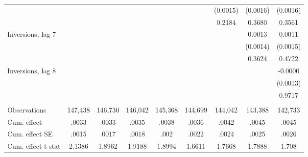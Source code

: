 \begin{tabular}{lcccccccc}
 &  &  &  &  &  & (0.0015) & (0.0016) & (0.0016) \\
 &  &  &  &  &  & 0.2184 & 0.3680 & 0.3561 \\
Inversions, lag 7 &  &  &  &  &  &  & 0.0013 & 0.0011 \\
 &  &  &  &  &  &  & (0.0014) & (0.0015) \\
 &  &  &  &  &  &  & 0.3624 & 0.4722 \\
Inversions, lag 8 &  &  &  &  &  &  &  & -0.0000 \\
 &  &  &  &  &  &  &  & (0.0013) \\
 &  &  &  &  &  &  &  & 0.9717 \\
 &  &  &  &  &  &  &  &  \\
Observations & 147,438 & 146,730 & 146,042 & 145,368 & 144,699 & 144,042 & 143,388 & 142,733 \\
Cum. effect & .0033 & .0033 & .0035 & .0038 & .0036 & .0042 & .0045 & .0045 \\
Cum. effect SE & .0015 & .0017 & .0018 & .002 & .0022 & .0024 & .0025 & .0026 \\
 Cum. effect t-stat & 2.1386 & 1.8962 & 1.9188 & 1.8994 & 1.6611 & 1.7668 & 1.7888 & 1.708 \\ \hline
\end{tabular}
